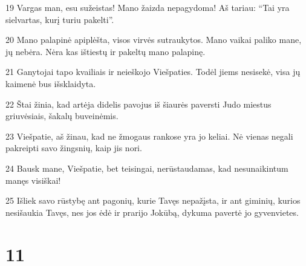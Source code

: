 \par 19 Vargas man, esu sužeistas! Mano žaizda nepagydoma! Aš tariau: “Tai yra sielvartas, kurį turiu pakelti”. 
\par 20 Mano palapinė apiplėšta, visos virvės sutraukytos. Mano vaikai paliko mane, jų nebėra. Nėra kas ištiestų ir pakeltų mano palapinę. 
\par 21 Ganytojai tapo kvailiais ir neieškojo Viešpaties. Todėl jiems nesisekė, visa jų kaimenė bus išsklaidyta. 
\par 22 Štai žinia, kad artėja didelis pavojus iš šiaurės paversti Judo miestus griuvėsiais, šakalų buveinėmis. 
\par 23 Viešpatie, aš žinau, kad ne žmogaus rankose yra jo keliai. Nė vienas negali pakreipti savo žingsnių, kaip jis nori. 
\par 24 Bausk mane, Viešpatie, bet teisingai, nerūstaudamas, kad nesunaikintum manęs visiškai! 
\par 25 Išliek savo rūstybę ant pagonių, kurie Tavęs nepažįsta, ir ant giminių, kurios nesišaukia Tavęs, nes jos ėdė ir prarijo Jokūbą, dykuma pavertė jo gyvenvietes.



\chapter{11}


